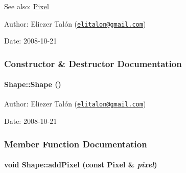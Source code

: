 \begin{Desc}
\item[See also:]\hyperlink{_shape_8hpp_535e59456e3e633842529cfa8ea103c4}{Pixel}\end{Desc}
\begin{Desc}
\item[Author:]Eliezer Talón (\href{mailto:elitalon@gmail.com}{\tt elitalon@gmail.com}) \end{Desc}
\begin{Desc}
\item[Date:]2008-10-21 \end{Desc}


\subsubsection{Constructor \& Destructor Documentation}
\hypertarget{class_shape_aa8d87171e65e0d8ba3c5459978992a7}{
\paragraph[{Shape}]{\setlength{\rightskip}{0pt plus 5cm}Shape::Shape ()}\hfill}
\label{class_shape_aa8d87171e65e0d8ba3c5459978992a7}


\begin{Desc}
\item[Author:]Eliezer Talón (\href{mailto:elitalon@gmail.com}{\tt elitalon@gmail.com}) \end{Desc}
\begin{Desc}
\item[Date:]2008-10-21 \end{Desc}


\subsubsection{Member Function Documentation}
\hypertarget{class_shape_f6114234203d9473f1fef9e6391f9243}{
\paragraph[{addPixel}]{\setlength{\rightskip}{0pt plus 5cm}void Shape::addPixel (const {\bf Pixel} \& {\em pixel})}\hfill}
\label{class_shape_f6114234203d9473f1fef9e6391f9243}


